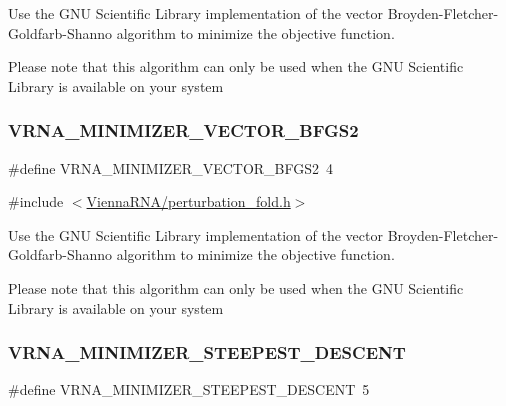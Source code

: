 Use the G\+NU Scientific Library implementation of the vector Broyden-\/\+Fletcher-\/\+Goldfarb-\/\+Shanno algorithm to minimize the objective function. 

Please note that this algorithm can only be used when the G\+NU Scientific Library is available on your system \mbox{\label{group__perturbation_ga7b0a65c6c92fa1d8012383ba9d3dcb4f}} 
\subsubsection{\texorpdfstring{VRNA\_MINIMIZER\_VECTOR\_BFGS2}{VRNA\_MINIMIZER\_VECTOR\_BFGS2}}
{\footnotesize\ttfamily \#define V\+R\+N\+A\+\_\+\+M\+I\+N\+I\+M\+I\+Z\+E\+R\+\_\+\+V\+E\+C\+T\+O\+R\+\_\+\+B\+F\+G\+S2~4}



{\ttfamily \#include $<$\mbox{\hyperlink{perturbation__fold_8h}{Vienna\+R\+N\+A/perturbation\+\_\+fold.\+h}}$>$}



Use the G\+NU Scientific Library implementation of the vector Broyden-\/\+Fletcher-\/\+Goldfarb-\/\+Shanno algorithm to minimize the objective function. 

Please note that this algorithm can only be used when the G\+NU Scientific Library is available on your system \mbox{\label{group__perturbation_ga9ecd2144c2ebed7533233da3986521b0}} 
\subsubsection{\texorpdfstring{VRNA\_MINIMIZER\_STEEPEST\_DESCENT}{VRNA\_MINIMIZER\_STEEPEST\_DESCENT}}
{\footnotesize\ttfamily \#define V\+R\+N\+A\+\_\+\+M\+I\+N\+I\+M\+I\+Z\+E\+R\+\_\+\+S\+T\+E\+E\+P\+E\+S\+T\+\_\+\+D\+E\+S\+C\+E\+NT~5}



